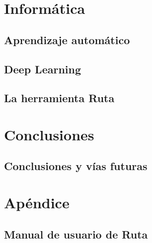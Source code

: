 \documentclass[ oneside,openany,titlepage,numbers=noenddot,headinclude,%
                footinclude=true,cleardoublepage=empty,abstractoff, %
                BCOR=5mm,paper=a4,fontsize=11pt,%
                spanish,american%
                ]{scrreprt}
\begin{document}
\part{Informática}

\chapter{Aprendizaje automático}\label{ch:learning}


\chapter{Deep Learning}\label{ch:deep}


\chapter{La herramienta Ruta}\label{ch:ruta}


\part{Conclusiones}

\chapter{Conclusiones y vías futuras}\label{ch:conclusions}


\appendix
\cleardoublepage
\part{Apéndice}
\chapter{Manual de usuario de Ruta}\label{ch:manual}

%
\cleardoublepage
\end{document}
